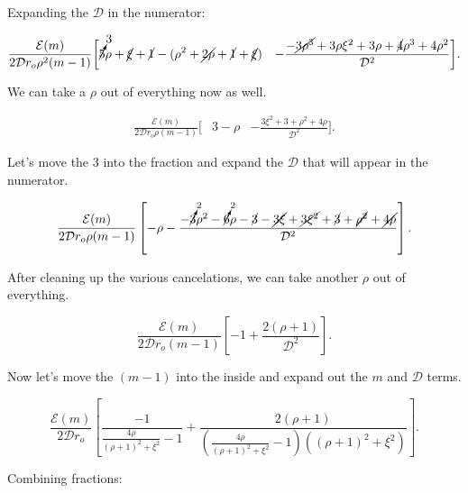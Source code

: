 \noindent Expanding the \(\mathcal{D}\) in the numerator:

\begin{equation}
    \begin{aligned}
        \frac{\mathcal{E}(m)}{2\mathcal{D}r_o\rho^2(m-1)} \bigg[&  \cancelto{3}{5}\rho+\cancel{\xi}+\cancel{1}-(\rho^2 + \cancel{2\rho} + \cancel{1} +\cancel{\xi})
      &- \frac{-\cancel{3\rho^3}+3\rho\xi^2+3\rho+\cancel{4}\rho^3 + 4\rho^2}{\mathcal{D}^2} \bigg].
    \end{aligned}
\end{equation}

\noindent We can take a \(\rho\) out of everything now as well.

\begin{equation}
    \begin{aligned}
        \frac{\mathcal{E}(m)}{2\mathcal{D}r_o\rho(m-1)} \bigg[&  3-\rho
      &- \frac{3\xi^2+3+\rho^2 + 4\rho}{\mathcal{D}^2} \bigg].
    \end{aligned}
\end{equation}

\noindent Let's move the 3 into the fraction and expand the \(\mathcal{D}\) that will appear in the numerator.

\begin{equation}
    \frac{\mathcal{E}(m)}{2\mathcal{D}r_o\rho(m-1)} \left[  -\rho - \frac{-\cancelto{2}{3}\rho^2 - \cancelto{2}{6}\rho - \cancel{3} -\cancel{3\xi} + \cancel{3\xi^2}+\cancel{3}+\cancel{\rho^2} + \cancel{4\rho}}{\mathcal{D}^2} \right].
\end{equation}

\noindent After cleaning up the various cancelations, we can take another \(\rho\) out of everything.

\begin{equation}
    \frac{\mathcal{E}(m)}{2\mathcal{D}r_o(m-1)} \left[ -1 + \frac{2(\rho + 1) }{\mathcal{D}^2} \right].
\end{equation}

\noindent Now let's move the \((m-1)\) into the inside and expand out the \(m\) and \(\mathcal{D}\) terms.

\begin{equation}
    \frac{\mathcal{E}(m)}{2\mathcal{D}r_o} \left[ \frac{-1}{\frac{4\rho}{(\rho+1)^2+\xi^2}-1} + \frac{2(\rho + 1) }{\left(\frac{4\rho}{(\rho+1)^2+\xi^2}-1\right)\left((\rho+1)^2+\xi^2\right)} \right].
\end{equation}

\noindent Combining fractions:

